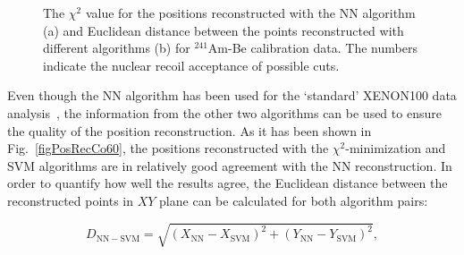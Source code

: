\begin{figure}[!b]
\centering
{}
\caption[The $\chi^{2}$ value for the positions reconstructed with the NN algorithm and Euclidean distance between the points reconstructed with different algorithms for $^{241}$Am-Be calibration data]{The $\chi^{2}$ value for the positions reconstructed with the NN algorithm (a) and Euclidean distance between the points reconstructed with different algorithms (b) for $^{241}$Am-Be calibration data. The numbers indicate the nuclear recoil acceptance of possible cuts.}
\label{figPosRecCuts}
\end{figure}

Even though the NN algorithm has been used for the `standard' XENON100 data analysis~\cite{xe100-run08}, the information from the other two algorithms can be used to ensure the quality of the position reconstruction. As it has been shown in Fig.~\ref{figPosRecCo60}, the positions reconstructed with the $\chi^{2}$-minimization and SVM algorithms are in relatively good agreement with the NN reconstruction. In order to quantify how well the results agree, the Euclidean distance between the reconstructed points in $XY$ plane can be calculated for both algorithm pairs:

\begin{equation}
\label{eqPosRec_1}
D_{\mathrm{NN-SVM}} = \sqrt{(X_{\mathrm{NN}}-X_{\mathrm{SVM}})^{2} + (Y_{\mathrm{NN}}-Y_{\mathrm{SVM}})^{2}},
\end{equation}

